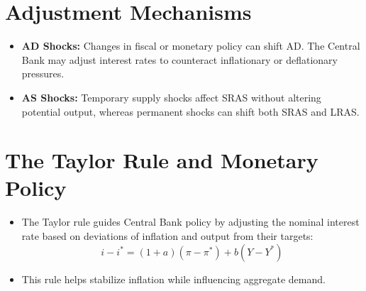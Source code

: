 \section*{Adjustment Mechanisms}
\begin{itemize}
    \item \textbf{AD Shocks:} Changes in fiscal or monetary policy can shift AD. The Central Bank may adjust interest rates to counteract inflationary or deflationary pressures.
    \item \textbf{AS Shocks:} Temporary supply shocks affect SRAS without altering potential output, whereas permanent shocks can shift both SRAS and LRAS.
\end{itemize}

\section*{The Taylor Rule and Monetary Policy}
\begin{itemize}
    \item The Taylor rule guides Central Bank policy by adjusting the nominal interest rate based on deviations of inflation and output from their targets:
    \[
    i - i^* = (1+a)(\pi - \pi^*) + b(Y - Y^*)
    \]
    \item This rule helps stabilize inflation while influencing aggregate demand.
\end{itemize}

